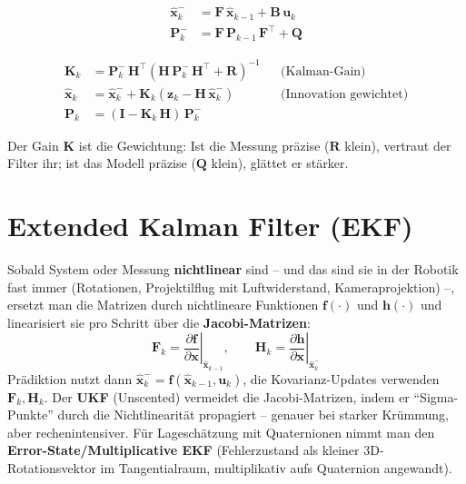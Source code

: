 \begin{infobox}[title=Prädiktion (Zeitschritt)]
\vspace{-6pt}
\begin{align*}
\hat{\bm{x}}_k^- &= \bm{F}\,\hat{\bm{x}}_{k-1} + \bm{B}\,\bm{u}_k \\
\bm{P}_k^-       &= \bm{F}\,\bm{P}_{k-1}\,\bm{F}^\top + \bm{Q}
\end{align*}
\end{infobox}
\begin{infobox}[title=Korrektur (Messupdate)]
\vspace{-6pt}
\begin{align*}
\bm{K}_k      &= \bm{P}_k^-\,\bm{H}^\top
  \left(\bm{H}\,\bm{P}_k^-\,\bm{H}^\top + \bm{R}\right)^{-1}
  &&\text{(Kalman-Gain)}\\
\hat{\bm{x}}_k &= \hat{\bm{x}}_k^-
  + \bm{K}_k\left(\bm{z}_k - \bm{H}\,\hat{\bm{x}}_k^-\right)
  &&\text{(Innovation gewichtet)}\\
\bm{P}_k      &= (\bm{I} - \bm{K}_k\,\bm{H})\,\bm{P}_k^-
\end{align*}
\end{infobox}
Der Gain $\bm{K}$ ist die Gewichtung: Ist die Messung präzise ($\bm{R}$ klein),
vertraut der Filter ihr; ist das Modell präzise ($\bm{Q}$ klein), glättet er
stärker.

\section{Extended Kalman Filter (EKF)}
Sobald System oder Messung \textbf{nichtlinear} sind -- und das sind sie in der
Robotik fast immer (Rotationen, Projektilflug mit Luftwiderstand,
Kameraprojektion) --, ersetzt man die Matrizen durch nichtlineare Funktionen
$\bm{f}(\cdot)$ und $\bm{h}(\cdot)$ und linearisiert sie pro Schritt über die
\textbf{Jacobi-Matrizen}:
\begin{equation}
\bm{F}_k = \left.\frac{\partial \bm{f}}{\partial \bm{x}}\right|_{\hat{\bm{x}}_{k-1}},
\qquad
\bm{H}_k = \left.\frac{\partial \bm{h}}{\partial \bm{x}}\right|_{\hat{\bm{x}}_k^-}
\end{equation}
Prädiktion nutzt dann $\hat{\bm{x}}_k^- = \bm{f}(\hat{\bm{x}}_{k-1},\bm{u}_k)$,
die Kovarianz-Updates verwenden $\bm{F}_k, \bm{H}_k$.
Der \textbf{UKF} (Unscented) vermeidet die Jacobi-Matrizen, indem er
``Sigma-Punkte'' durch die Nichtlinearität propagiert -- genauer bei starker
Krümmung, aber rechenintensiver. Für Lageschätzung mit Quaternionen nimmt man
den \textbf{Error-State/Multiplicative EKF} (Fehlerzustand als kleiner 3D-Rotationsvektor
im Tangentialraum, multiplikativ aufs Quaternion angewandt).

